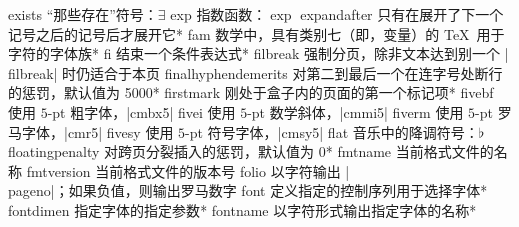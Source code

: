 \capcs exists {“那些存在”符号：$\exists$}{}{}
\capcs exp {指数函数：$\exp$}{}{}
\capcs expandafter {只有在展开了下一个记号之后的记号后才展开它}*{}
\capcs fam {数学中，具有类别七（即，变量）的 \TeX\ 用于字符的字体族}*{}
\capcs fi {结束一个条件表达式}*{\@fi}
\capcs filbreak {强制分页，除非文本达到别一个 |\\filbreak| 时仍适合于本页}{}{}
\capcs finalhyphendemerits {对第二到最后一个在连字号处断行的惩罚，默认值为 5000}*{}
\capcs firstmark {刚处于盒子内的页面的第一个标记项}*{}
\capcs fivebf {使用 $5$-pt 粗字体，|cmbx5|}{}{}
\capcs fivei {使用 $5$-pt 数学斜体，|cmmi5|}{}{}
\capcs fiverm {使用 $5$-pt 罗马字体，|cmr5|}{}{}
\capcs fivesy {使用 $5$-pt 符号字体，|cmsy5|}{}{}
\capcs flat {音乐中的降调符号：$\flat$}{}{}
\capcs floatingpenalty {对跨页分裂插入的惩罚，默认值为 0}*{}
\capcs fmtname {当前格式文件的名称}{}{}
\capcs fmtversion {当前格式文件的版本号}{}{}
\capcs folio {以字符输出 |\\pageno|；如果负值，则输出罗马数字}{}{}
\capcs font {定义指定的控制序列用于选择字体}*{}
\capcs fontdimen {指定字体的指定参数}*{}
\capcs fontname {以字符形式输出指定字体的名称}*{}
